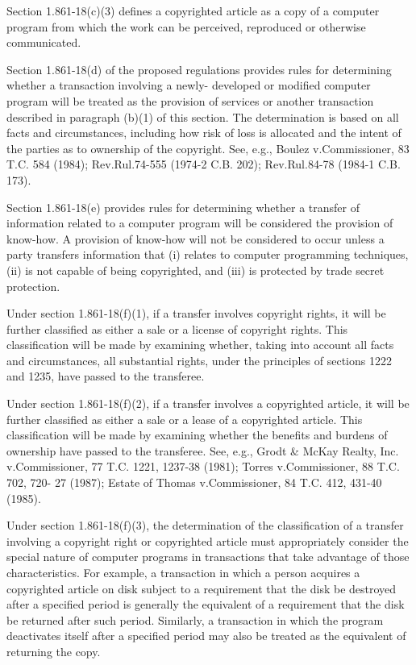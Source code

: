 \begin{select}
Section 1.861-18(c)(3) defines a copyrighted article as a copy of a computer program from which the work can be perceived, reproduced or otherwise communicated.

Section 1.861-18(d) of the proposed regulations provides rules for determining whether a transaction involving a newly- developed or modified computer program will be treated as the provision of services or another transaction described in paragraph (b)(1) of this section. The determination is based on all facts and circumstances, including how risk of loss is allocated and the intent of the parties as to ownership of the copyright. See, e.g., Boulez v.\@ Commissioner, 83 T.C. 584 (1984); Rev.\@\@ Rul.\@ 74-555 (1974-2 C.B. 202); Rev.\@\@ Rul.\@ 84-78 (1984-1 C.B. 173).

Section 1.861-18(e) provides rules for determining whether a transfer of information related to a computer program will be considered the provision of know-how. A provision of know-how will not be considered to occur unless a party transfers information that (i) relates to computer programming techniques, (ii) is not capable of being copyrighted, and (iii) is protected by trade secret protection.

Under section 1.861-18(f)(1), if a transfer involves copyright rights, it will be further classified as either a sale or a license of copyright rights. This classification will be made by examining whether, taking into account all facts and circumstances, all substantial rights, under the principles of sections 1222 and 1235, have passed to the transferee.

Under section 1.861-18(f)(2), if a transfer involves a copyrighted article, it will be further classified as either a sale or a lease of a copyrighted article. This classification will be made by examining whether the benefits and burdens of ownership have passed to the transferee. See, e.g., Grodt \& McKay Realty, Inc. v.\@ Commissioner, 77 T.C. 1221, 1237-38 (1981); Torres v.\@ Commissioner, 88 T.C. 702, 720- 27 (1987); Estate of Thomas v.\@ Commissioner, 84 T.C. 412, 431-40 (1985).

Under section 1.861-18(f)(3), the determination of the classification of a transfer involving a copyright right or copyrighted article must appropriately consider the special nature of computer programs in transactions that take advantage of those characteristics. For example, a transaction in which a person acquires a copyrighted article on disk subject to a requirement that the disk be destroyed after a specified period is generally the equivalent of a requirement that the disk be returned after such period. Similarly, a transaction in which the program deactivates itself after a specified period may also be treated as the equivalent of returning the copy.


\end{select}
